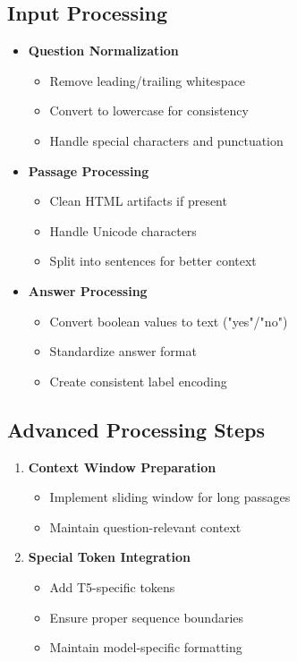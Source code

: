 \documentclass[12pt,a4paper]{report}
\begin{document}
\subsection{Input Processing}
\begin{itemize}
    \item \textbf{Question Normalization}
        \begin{itemize}
            \item Remove leading/trailing whitespace
            \item Convert to lowercase for consistency
            \item Handle special characters and punctuation
        \end{itemize}
    
    \item \textbf{Passage Processing}
        \begin{itemize}
            \item Clean HTML artifacts if present
            \item Handle Unicode characters
            \item Split into sentences for better context
        \end{itemize}
        
    \item \textbf{Answer Processing}
        \begin{itemize}
            \item Convert boolean values to text ("yes"/"no")
            \item Standardize answer format
            \item Create consistent label encoding
        \end{itemize}
\end{itemize}

\subsection{Advanced Processing Steps}
\begin{enumerate}
    \item \textbf{Context Window Preparation}
        \begin{itemize}
            \item Implement sliding window for long passages
            \item Maintain question-relevant context
        \end{itemize}
    
    \item \textbf{Special Token Integration}
        \begin{itemize}
            \item Add T5-specific tokens
            \item Ensure proper sequence boundaries
            \item Maintain model-specific formatting
        \end{itemize}
\end{enumerate}
\end{document}
